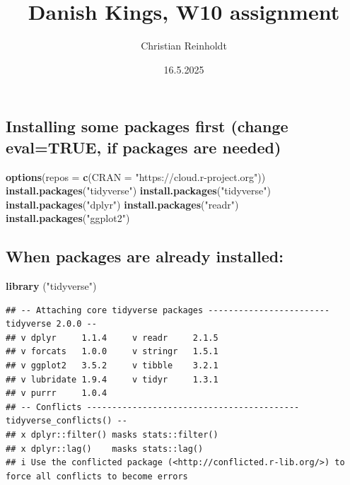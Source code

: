 \documentclass[
]{article}
\title{Danish Kings, W10 assignment}
\author{Christian Reinholdt}
\date{16.5.2025}
\newenvironment{Shaded}{\begin{snugshade}}{\end{snugshade}}
\newcommand{\AttributeTok}[1]{\textcolor[rgb]{0.13,0.29,0.53}{#1}}
\newcommand{\ConstantTok}[1]{\textcolor[rgb]{0.56,0.35,0.01}{#1}}
\newcommand{\FunctionTok}[1]{\textcolor[rgb]{0.13,0.29,0.53}{\textbf{#1}}}
\newcommand{\NormalTok}[1]{#1}
\newcommand{\SpecialCharTok}[1]{\textcolor[rgb]{0.81,0.36,0.00}{\textbf{#1}}}
\newcommand{\StringTok}[1]{\textcolor[rgb]{0.31,0.60,0.02}{#1}}
\begin{document}
\maketitle

\begin{Shaded}
\end{Shaded}

\subsection{Installing some packages first (change eval=TRUE, if
packages are
needed)}\label{installing-some-packages-first-change-evaltrue-if-packages-are-needed}

\begin{Shaded}
\begin{Highlighting}[]
\FunctionTok{options}\NormalTok{(}\AttributeTok{repos =} \FunctionTok{c}\NormalTok{(}\AttributeTok{CRAN =} \StringTok{"https://cloud.r{-}project.org"}\NormalTok{))}
\FunctionTok{install.packages}\NormalTok{(}\StringTok{"tidyverse"}\NormalTok{)}
\FunctionTok{install.packages}\NormalTok{(}\StringTok{"tidyverse"}\NormalTok{)}
\FunctionTok{install.packages}\NormalTok{(}\StringTok{"dplyr"}\NormalTok{)}
\FunctionTok{install.packages}\NormalTok{(}\StringTok{"readr"}\NormalTok{)}
\FunctionTok{install.packages}\NormalTok{(}\StringTok{"ggplot2"}\NormalTok{)}
\end{Highlighting}
\end{Shaded}

\subsection{When packages are already
installed:}\label{when-packages-are-already-installed}

\begin{Shaded}
\begin{Highlighting}[]
\FunctionTok{library}\NormalTok{ (}\StringTok{"tidyverse"}\NormalTok{)}
\end{Highlighting}
\end{Shaded}

\begin{verbatim}
## -- Attaching core tidyverse packages ------------------------ tidyverse 2.0.0 --
## v dplyr     1.1.4     v readr     2.1.5
## v forcats   1.0.0     v stringr   1.5.1
## v ggplot2   3.5.2     v tibble    3.2.1
## v lubridate 1.9.4     v tidyr     1.3.1
## v purrr     1.0.4     
## -- Conflicts ------------------------------------------ tidyverse_conflicts() --
## x dplyr::filter() masks stats::filter()
## x dplyr::lag()    masks stats::lag()
## i Use the conflicted package (<http://conflicted.r-lib.org/>) to force all conflicts to become errors
\end{verbatim}
\end{document}
